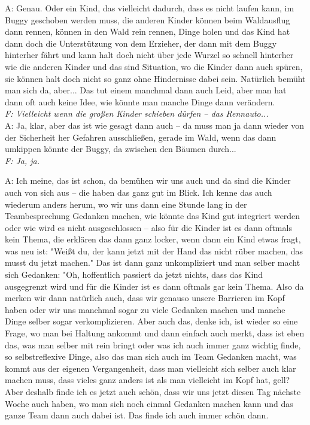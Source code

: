 \begin{linenumbers*}
A: Genau. Oder ein Kind, das vielleicht dadurch, dass es nicht laufen kann, im Buggy geschoben werden muss, die anderen Kinder können beim Waldausflug dann rennen, können in den Wald rein rennen, Dinge holen und das Kind hat dann doch die Unterstützung von dem Erzieher, der dann mit dem Buggy hinterher fährt und kann halt doch nicht über jede Wurzel so schnell hinterher wie die anderen Kinder und das sind Situation, wo die Kinder dann auch spüren, sie können halt doch nicht so ganz ohne Hindernisse dabei sein. Natürlich bemüht man sich da, aber... Das tut einem manchmal dann auch Leid, aber man hat dann oft auch keine Idee, wie könnte man manche Dinge dann verändern.\\
\emph{F: Vielleicht wenn die großen Kinder schieben dürfen -- das Rennauto...}\\
A: Ja, klar, aber das ist wie gesagt dann auch -- da muss man ja dann wieder von der Sicherheit her Gefahren ausschließen, gerade im Wald, wenn das dann umkippen könnte der Buggy, da zwischen den Bäumen durch...\\
\emph{F: Ja, ja.}

A: Ich meine, das ist schon, da bemühen wir uns auch und da sind die Kinder auch von sich aus -- die haben das ganz gut im Blick. 
Ich kenne das auch wiederum anders herum, wo wir uns dann eine Stunde lang in der Teambesprechung Gedanken machen, wie könnte das Kind gut integriert werden oder wie wird es nicht ausgeschlossen -- also für die Kinder ist es dann oftmals kein Thema, die erklären das dann ganz locker, wenn dann ein Kind etwas fragt, was neu ist: "Weißt du, der kann jetzt mit der Hand das nicht rüber machen, das musst du jetzt machen." Das ist dann ganz unkompliziert und man selber macht sich Gedanken: "Oh, hoffentlich passiert da jetzt nichts, dass das Kind ausgegrenzt wird und für die Kinder ist es dann oftmals gar kein Thema. 
Also da merken wir dann natürlich auch, dass wir genauso unsere Barrieren im Kopf haben oder wir uns manchmal sogar zu viele Gedanken machen und manche Dinge selber sogar verkomplizieren. Aber auch das, denke ich, ist wieder so eine Frage, wo man bei Haltung ankommt und dann einfach auch merkt, dass ist eben das, was man selber mit rein 
bringt oder was ich auch immer ganz wichtig finde, so selbstreflexive Dinge, also das man sich auch im Team Gedanken macht, was kommt aus der eigenen Vergangenheit, dass man vielleicht sich selber auch klar machen muss, dass vieles ganz anders ist als man vielleicht im Kopf hat, gell? 
Aber deshalb finde ich es jetzt auch schön, dass wir uns jetzt diesen Tag nächste Woche auch haben, wo man sich noch einmal Gedanken machen kann und das ganze Team dann auch dabei ist. Das finde ich auch immer schön dann.


\end{linenumbers*}

